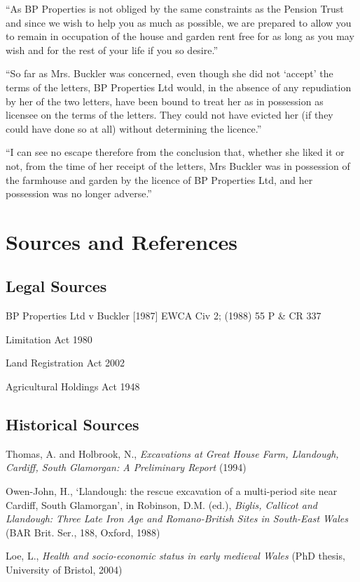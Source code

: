 \documentclass[11pt,a4paper]{article}
\begin{document}
``As BP Properties is not obliged by the same constraints as the Pension Trust and since we wish to help you as much as possible, we are prepared to allow you to remain in occupation of the house and garden rent free for as long as you may wish and for the rest of your life if you so desire.''

``So far as Mrs. Buckler was concerned, even though she did not `accept' the terms of the letters, BP Properties Ltd would, in the absence of any repudiation by her of the two letters, have been bound to treat her as in possession as licensee on the terms of the letters. They could not have evicted her (if they could have done so at all) without determining the licence.''

``I can see no escape therefore from the conclusion that, whether she liked it or not, from the time of her receipt of the letters, Mrs Buckler was in possession of the farmhouse and garden by the licence of BP Properties Ltd, and her possession was no longer adverse.''

\section{Sources and References}

\subsection{Legal Sources}

\begin{enumerate}[label={[\arabic*]}]
    \item BP Properties Ltd v Buckler [1987] EWCA Civ 2; (1988) 55 P \& CR 337
    \item Limitation Act 1980
    \item Land Registration Act 2002
    \item Agricultural Holdings Act 1948
\end{enumerate}

\subsection{Historical Sources}

\begin{enumerate}[label={[\arabic*]}]
    \item Thomas, A. and Holbrook, N., \textit{Excavations at Great House Farm, Llandough, Cardiff, South Glamorgan: A Preliminary Report} (1994)
    \item Owen-John, H., `Llandough: the rescue excavation of a multi-period site near Cardiff, South Glamorgan', in Robinson, D.M. (ed.), \textit{Biglis, Callicot and Llandough: Three Late Iron Age and Romano-British Sites in South-East Wales} (BAR Brit. Ser., 188, Oxford, 1988)
    \item Loe, L., \textit{Health and socio-economic status in early medieval Wales} (PhD thesis, University of Bristol, 2004)
\end{enumerate}
\end{document}
